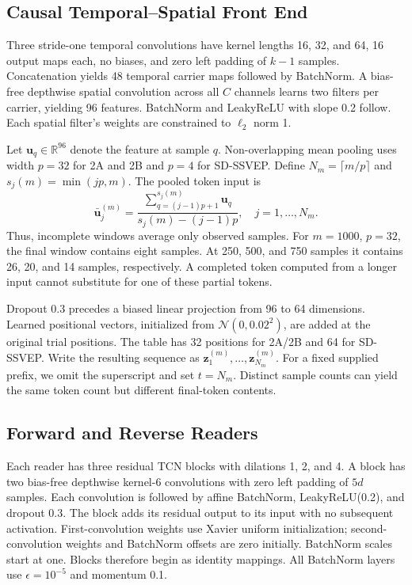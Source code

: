 \documentclass[conference]{IEEEtran}
\begin{document}
\subsection{Causal Temporal--Spatial Front End}
Three stride-one temporal convolutions have kernel lengths 16, 32, and 64,
16 output maps each, no biases, and zero left padding of $k-1$ samples.
Concatenation yields 48 temporal carrier maps followed by BatchNorm.
A bias-free depthwise spatial convolution across all $C$ channels learns two
filters per carrier, yielding 96 features. BatchNorm and LeakyReLU with slope
0.2 follow. Each spatial filter's weights are constrained to $\ell_2$ norm 1.

Let $\mathbf u_q\in\mathbb R^{96}$ denote the feature at sample $q$.
Non-overlapping mean pooling uses width $p=32$ for 2A and 2B and $p=4$
for SD-SSVEP. Define $N_m=\lceil m/p\rceil$ and $s_j(m)=\min(jp,m)$.
The pooled token input is
\begin{equation}
\bar{\mathbf u}_j^{(m)}=
\frac{\sum_{q=(j-1)p+1}^{s_j(m)}\mathbf u_q}{s_j(m)-(j-1)p},
\quad j=1,\ldots,N_m.
\end{equation}
Thus, incomplete windows average only observed samples. For $m=1000$, $p=32$,
the final window contains eight samples. At 250, 500, and 750 samples it
contains 26, 20, and 14 samples, respectively. A completed token computed from
a longer input cannot substitute for one of these partial tokens.

Dropout 0.3 precedes a biased linear projection from 96 to 64 dimensions.
Learned positional vectors, initialized from $\mathcal N(0,0.02^2)$, are added
at the original trial positions. The table has 32 positions for 2A/2B and 64
for SD-SSVEP. Write the resulting sequence as
$\mathbf z_1^{(m)},\ldots,\mathbf z_{N_m}^{(m)}$. For a fixed supplied prefix,
we omit the superscript and set $t=N_m$. Distinct sample counts can yield
the same token count but different final-token contents.

\subsection{Forward and Reverse Readers}
Each reader has three residual TCN blocks with dilations 1, 2, and 4.
A block has two bias-free depthwise kernel-6 convolutions with zero left
padding of $5d$ samples. Each convolution is followed by affine BatchNorm,
LeakyReLU(0.2), and dropout 0.3. The block adds its residual output to its
input with no subsequent activation. First-convolution weights use Xavier
uniform initialization; second-convolution weights and BatchNorm offsets are
zero initially. BatchNorm scales start at one. Blocks therefore begin as
identity mappings. All BatchNorm layers use $\epsilon=10^{-5}$ and momentum 0.1.
\end{document}
